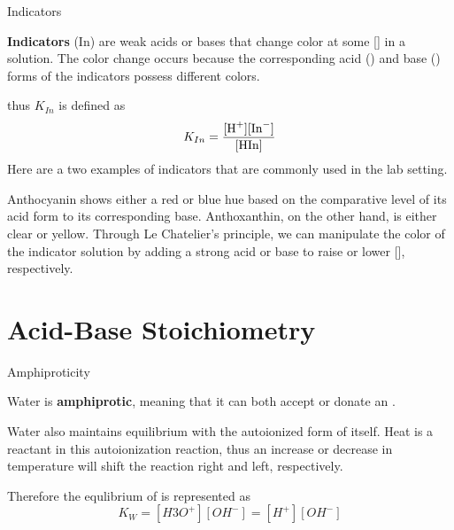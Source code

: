 \documentclass[10pt]{article}
\begin{document}
  \begin{core}[label=core:indicator]{Indicators}

    \textbf{Indicators} (In) are weak acids or bases that change color at some [] in a solution. The color change occurs because the corresponding acid () and base () forms of the indicators possess different colors.
  
  
    thus $K_{In}$ is defined as 
    \[
      K_{In} = \frac{[\ce{H+}][\ce{In-}]}{[\ce{HIn}]}
    \] 
    Here are a two examples of indicators that are commonly used in the lab setting.



    Anthocyanin shows either a red or blue hue based on the comparative level of its acid form to its corresponding base. Anthoxanthin, on the other hand, is either clear or yellow. Through Le Chatelier's principle, we can manipulate the color of the indicator solution by adding a strong acid or base to raise or lower [], respectively. 

  \end{core}
  
\section{Acid-Base Stoichiometry}

  \begin{core}{Amphiproticity}
 
    Water is \textbf{amphiprotic}, meaning that it can both accept or donate an .



    Water also maintains equilibrium with the autoionized form of itself. Heat is a reactant in this autoionization reaction, thus an increase or decrease in temperature will shift the reaction right and left, respectively.


    Therefore the equlibrium of  is represented as
    \[
      K_{W} = [H3O^{+}][OH^{-}] = [H^{+}][OH^{-}]
    \]

  \end{core}
\end{document}
